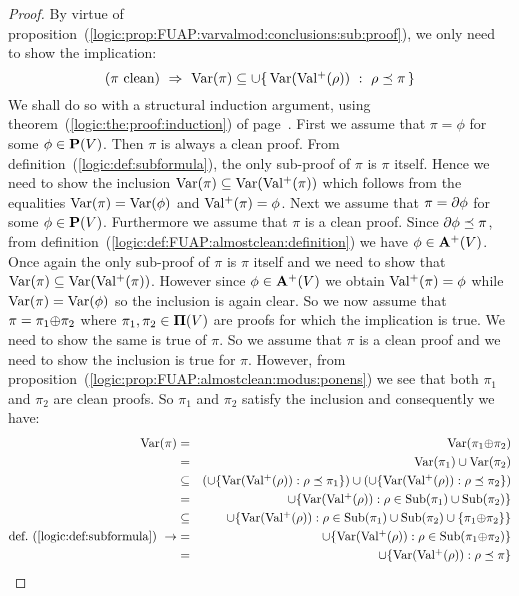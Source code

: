 \begin{proof}
By virtue of
proposition~(\ref{logic:prop:FUAP:varvalmod:conclusions:sub:proof}),
we only need to show the implication:
    \[
    (\mbox{$\pi$ clean})\ \Rightarrow\ \mbox{\rm Var}(\pi)
    \subseteq\cup\{\,\mbox{\rm Var}(\mbox{$\rm Val^{+}$}(\rho))\ :\
    \rho\preceq\pi\,\}
    \]
We shall do so with a structural induction argument, using
theorem~(\ref{logic:the:proof:induction}) of
page~\pageref{logic:the:proof:induction}. First we assume that
$\pi=\phi$ for some $\phi\in\mbox{${\bf P}(V)$}$. Then $\pi$ is always a clean
proof. From definition~(\ref{logic:def:subformula}), the only
sub-proof of $\pi$ is $\pi$ itself. Hence we need to show the
inclusion $\mbox{\rm Var}(\pi)\subseteq\mbox{\rm Var}(\mbox{$\rm Val^{+}$}(\pi))$ which follows from
the equalities $\mbox{\rm Var}(\pi)=\mbox{\rm Var}(\phi)$ and $\mbox{$\rm Val^{+}$}(\pi)=\phi$. Next we
assume that $\pi=\mbox{$\partial$}\phi$ for some $\phi\in\mbox{${\bf P}(V)$}$. Furthermore we
assume that $\pi$ is a clean proof. Since $\mbox{$\partial$}\phi\preceq\pi$, from
definition~(\ref{logic:def:FUAP:almostclean:definition}) we have
$\phi\in\mbox{${\bf A}^{+}(V)$}$. Once again the only sub-proof of $\pi$ is $\pi$
itself and we need to show that
$\mbox{\rm Var}(\pi)\subseteq\mbox{\rm Var}(\mbox{$\rm Val^{+}$}(\pi))$. However since $\phi\in\mbox{${\bf A}^{+}(V)$}$ we
obtain $\mbox{$\rm Val^{+}$}(\pi)=\phi$ while $\mbox{\rm Var}(\pi)=\mbox{\rm Var}(\phi)$ so the
inclusion is again clear. So we now assume that
$\pi=\pi_{1}\mbox{$\oplus$}\pi_{2}$ where $\pi_{1},\pi_{2}\in\mbox{${\bf\Pi}(V)$}$ are proofs
for which the implication is true. We need to show the same is true
of $\pi$. So we assume that $\pi$ is a clean proof and we need to
show the inclusion is true for $\pi$. However, from
proposition~(\ref{logic:prop:FUAP:almostclean:modus:ponens}) we see
that both $\pi_{1}$ and $\pi_{2}$ are clean proofs. So $\pi_{1}$ and
$\pi_{2}$ satisfy the inclusion and consequently we have:
    \begin{eqnarray*}
    \var(\pi)&=&\var(\pi_{1}\pon\pi_{2})\\
    &=&\var(\pi_{1})\cup\var(\pi_{2})\\
    &\subseteq&(\cup\{\var(\vals(\rho)):\rho\preceq\pi_{1}\})
    \cup(\cup\{\var(\vals(\rho)):\rho\preceq\pi_{2}\})\\
    &=&\cup\{\var(\vals(\rho)):\rho\in\subf(\pi_{1})\cup\subf(\pi_{2})\}\\
    &\subseteq&\cup\{\var(\vals(\rho)):\rho\in\subf(\pi_{1})\cup\subf(\pi_{2})
    \cup\{\pi_{1}\pon\pi_{2}\}\}\\
    \mbox{def.~(\ref{logic:def:subformula})}\ \rightarrow
    &=&\cup\{\var(\vals(\rho)):\rho\in\subf(\pi_{1}\pon\pi_{2})\}\\
    &=&\cup\{\var(\vals(\rho)):\rho\preceq\pi\}\\

\end{eqnarray*}
\end{proof}
